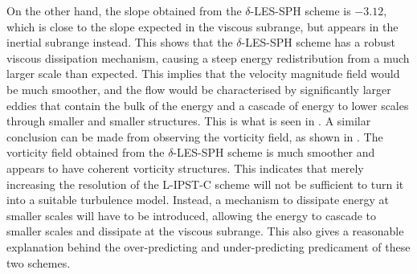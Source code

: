 On the other hand, the slope obtained from the $\delta$-LES-SPH scheme is $-3.12$, which is close to the slope expected in the viscous subrange, but appears in the inertial subrange instead. This shows that the $\delta$-LES-SPH scheme has a robust viscous dissipation mechanism, causing a steep energy redistribution from a much larger scale than expected. This implies that the velocity magnitude field would be much smoother, and the flow would be characterised by significantly larger eddies that contain the bulk of the energy and a cascade of energy to lower scales through smaller and smaller structures. This is what is seen in .
A similar conclusion can be made from observing the vorticity field, as shown in . The vorticity field obtained from the $\delta$-LES-SPH scheme is much smoother and appears to have coherent vorticity structures.
This indicates that merely increasing the resolution of the L-IPST-C scheme will not be sufficient to turn it into a suitable turbulence model. Instead, a mechanism to dissipate energy at smaller scales will have to be introduced, allowing the energy to cascade to smaller scales and dissipate at the viscous subrange.
This also gives a reasonable explanation behind the over-predicting and under-predicting predicament of these two schemes.



